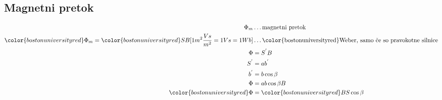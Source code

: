 {\color{indiagreen}\subsection{Magnetni pretok}}
\begin{align*}
	\Phi_m &\dots \text{magnetni pretok}\\
	{\color{bostonuniversityred}\Phi_m} = {\color{bostonuniversityred}SB}[1 m^2 \frac{Vs}{m^2} = 1 Vs = 1 Wb] &\dots \text{{\color{bostonuniversityred}Weber}, samo če so pravokotne silnice}\\
	\Phi &= S^{'} B\\
	S^{'} &= ab^{'}\\
	b^{'} &= b\cos\beta\\
	\Phi &= ab\cos\beta B\\
	{\color{bostonuniversityred}\Phi} &= {\color{bostonuniversityred}BS\cos\beta}\\
\end{align*}